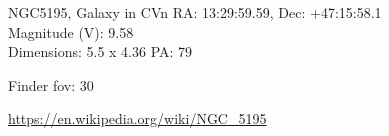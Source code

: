 \begin{block}{NGC5195, Galaxy in CVn}
    RA: 13:29:59.59, Dec: +47:15:58.1 \\ 
    Magnitude (V): 9.58 \\ 
    Dimensions: 5.5 x 4.36 PA: 79 

    Finder fov: 30 

    \url{https://en.wikipedia.org/wiki/NGC_5195} 
\end{block}